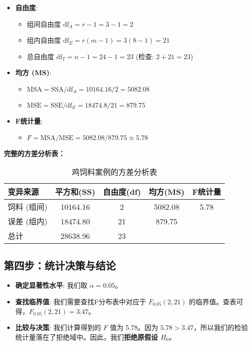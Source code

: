 \documentclass[12pt, a4paper]{amsart}
\begin{document}
\begin{itemize}
    \item \textbf{自由度}:
    \begin{itemize}
        \item 组间自由度 $\text{df}_A = r-1 = 3-1 = 2$
        \item 组内自由度 $\text{df}_E = r(m-1) = 3(8-1) = 21$
        \item 总自由度 $\text{df}_T = n-1 = 24-1 = 23$ (检查: $2+21=23$)
    \end{itemize}
    \item \textbf{均方 (MS)}:
    \begin{itemize}
        \item $\text{MSA} = \text{SSA} / \text{df}_A = 10164.16 / 2 = 5082.08$
        \item $\text{MSE} = \text{SSE} / \text{df}_E = 18474.8 / 21 = 879.75$
    \end{itemize}
    \item \textbf{F统计量}:
    \begin{itemize}
        \item $F = \text{MSA} / \text{MSE} = 5082.08 / 879.75 \approx 5.78$
    \end{itemize}
\end{itemize}

\textbf{完整的方差分析表：}
\begin{table}[h!]
\centering
\caption{鸡饲料案例的方差分析表}
\begin{tabular}{lcccc}
\toprule
\textbf{变异来源} & \textbf{平方和(SS)} & \textbf{自由度(df)} & \textbf{均方(MS)} & \textbf{F统计量} \\
\midrule
饲料 (组间) & 10164.16 & 2 & 5082.08 & 5.78 \\
误差 (组内) & 18474.80 & 21 & 879.75 & \\
\midrule
总计 & 28638.96 & 23 & & \\
\bottomrule
\end{tabular}
\end{table}

\subsection{第四步：统计决策与结论}
\begin{itemize}
    \item \textbf{确定显著性水平}: 我们取 $\alpha = 0.05$。
    \item \textbf{查找临界值}: 我们需要查找F分布表中对应于 $F_{0.05}(2, 21)$ 的临界值。查表可得，$F_{0.05}(2, 21) = 3.47$。
    \item \textbf{比较与决策}: 我们计算得到的 $F$ 值为 5.78。因为 $5.78 > 3.47$，所以我们的检验统计量落在了拒绝域中。因此，我们\textbf{拒绝原假设 $H_0$}。
\end{itemize}
\end{document}
